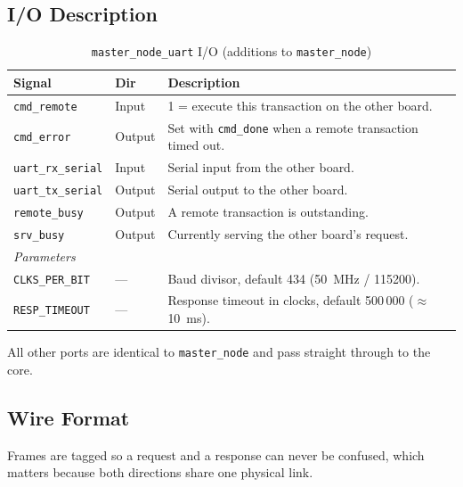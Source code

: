 \documentclass[11pt,a4paper]{article}
\newcommand{\sig}[1]{\texttt{#1}}
\begin{document}
\subsection{I/O Description}

\begin{table}[htbp]
\centering
\caption{\sig{master\_node\_uart} I/O (additions to \sig{master\_node})}
\label{tab:io_uartmaster}
\small
\begin{tabularx}{\textwidth}{llX}
\toprule
\textbf{Signal} & \textbf{Dir} & \textbf{Description} \\
\midrule
\sig{cmd\_remote}     & Input  & 1 = execute this transaction on the other board. \\
\sig{cmd\_error}      & Output & Set with \sig{cmd\_done} when a remote transaction timed out. \\
\sig{uart\_rx\_serial}& Input  & Serial input from the other board. \\
\sig{uart\_tx\_serial}& Output & Serial output to the other board. \\
\sig{remote\_busy}    & Output & A remote transaction is outstanding. \\
\sig{srv\_busy}       & Output & Currently serving the other board's request. \\
\midrule
\multicolumn{3}{l}{\emph{Parameters}} \\
\sig{CLKS\_PER\_BIT}  & --- & Baud divisor, default 434 (50~MHz / 115200). \\
\sig{RESP\_TIMEOUT}   & --- & Response timeout in clocks, default 500\,000 ($\approx$10~ms). \\
\bottomrule
\end{tabularx}
\end{table}

All other ports are identical to \sig{master\_node} and pass straight through to
the core.

\subsection{Wire Format}

Frames are tagged so a request and a response can never be confused, which
matters because both directions share one physical link.
\end{document}
